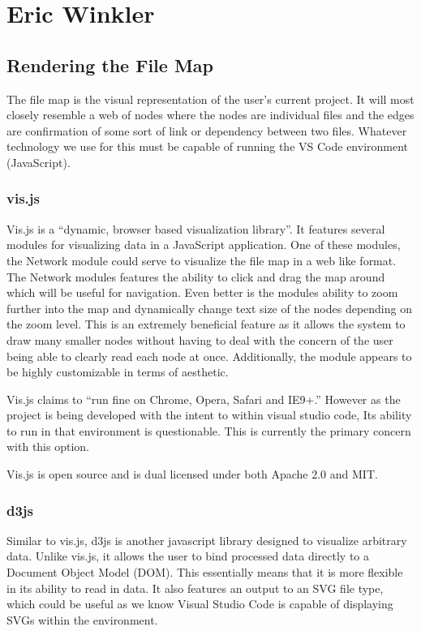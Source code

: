 \documentclass[letterpaper,10pt,titlepage,draftclsnofoot,onecolumn,onesided] {IEEEtran}
\begin{document}
\section{Eric Winkler}
\subsection{Rendering the File Map}
The file map is the visual representation of the user's current project. 
It will most closely resemble a web of nodes where the nodes are individual files and the edges are confirmation of some sort of link or dependency between two files. 
Whatever technology we use for this must be capable of running the VS Code environment (JavaScript).
\subsubsection{vis.js}
Vis.js is a ``dynamic, browser based visualization library''. 
It features several modules for visualizing data in a JavaScript application. 
One of these modules, the Network module could serve to visualize the file map in a web like format. 
The Network modules features the ability to click and drag the map around which will be useful for navigation. 
Even better is the modules ability to zoom further into the map and dynamically change text size of the nodes depending on the zoom level. 
This is an extremely beneficial feature as it allows the system to draw many smaller nodes without having to deal with the concern of the user being able to clearly read each node at once. 
Additionally, the module appears to be highly customizable in terms of aesthetic.

Vis.js claims to ``run fine on Chrome, Opera, Safari and IE9+.'' However as the project is being developed with the intent to within visual studio code, Its ability to run in that environment is questionable. This is currently the primary concern with this option.

Vis.js  is open source and is dual licensed under both Apache 2.0 and MIT.

\subsubsection{d3js}
Similar to vis.js, d3js is another javascript library designed to visualize arbitrary data. 
Unlike vis.js, it allows the user to bind processed data directly to a Document Object Model (DOM). 
This essentially means that it is more flexible in its ability to read in data. 
It also features an output to an SVG file type, which could be useful as we know Visual Studio Code is capable of displaying SVGs within the environment. 
\end{document}
